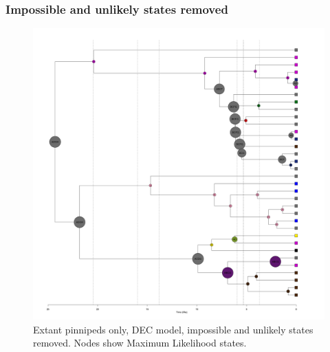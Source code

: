 \documentclass[a4paper, 12pt]{article}
\begin{document}
\subsubsection{Impossible and unlikely states removed}

\begin{figure}[H]
 \centering
  \includegraphics[width = \linewidth]{figures/extant-pinnipeds-DEC-unlikely-MLstates.png}
  \caption{Extant pinnipeds only, DEC model, impossible and unlikely states removed. Nodes show Maximum Likelihood states.}
  \label{fig-extant-dec-ml-unlikely}
\end{figure} 
\end{document}
